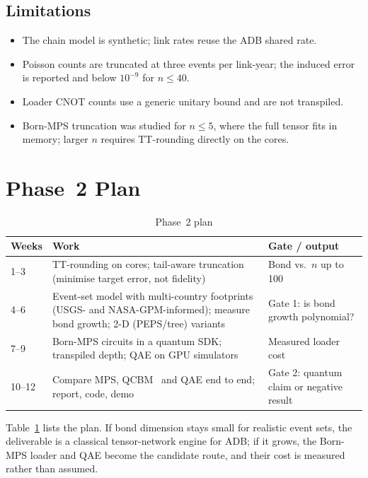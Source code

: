 \documentclass[conference]{IEEEtran}
\begin{document}
\subsection{Limitations}
\begin{itemize}
\item The chain model is synthetic; link rates reuse the ADB shared rate.
\item Poisson counts are truncated at three events per link-year; the induced error is reported and below $10^{-9}$
for $n\le40$.
\item Loader CNOT counts use a generic unitary bound and are not transpiled.
\item Born-MPS truncation was studied for $n\le5$, where the full tensor fits in memory; larger $n$ requires
TT-rounding directly on the cores.
\end{itemize}

\section{Phase~2 Plan}
\begin{table}[t]
\caption{Phase~2 plan}
\label{tab:plan}
\centering\small
\setlength{\tabcolsep}{3pt}
\begin{tabular}{p{}p{}p{}}
\toprule
Weeks & Work & Gate / output\\
\midrule
1--3 & TT-rounding on cores; tail-aware truncation (minimise target error, not fidelity) & Bond vs.\ $n$ up to 100\\
4--6 & Event-set model with multi-country footprints (USGS- and NASA-GPM-informed); measure bond growth; 2-D (PEPS/tree) variants & Gate 1: is bond growth polynomial?\\
7--9 & Born-MPS circuits in a quantum SDK; transpiled depth; QAE on GPU simulators & Measured loader cost\\
10--12 & Compare MPS, QCBM~\cite{benedetti2019} and QAE end to end; report, code, demo & Gate 2: quantum claim or negative result\\
\bottomrule
\end{tabular}
\end{table}

Table~\ref{tab:plan} lists the plan. If bond dimension stays small for realistic event sets, the deliverable is a
classical tensor-network engine for ADB; if it grows, the Born-MPS loader and QAE become the candidate route, and
their cost is measured rather than assumed.
\end{document}
